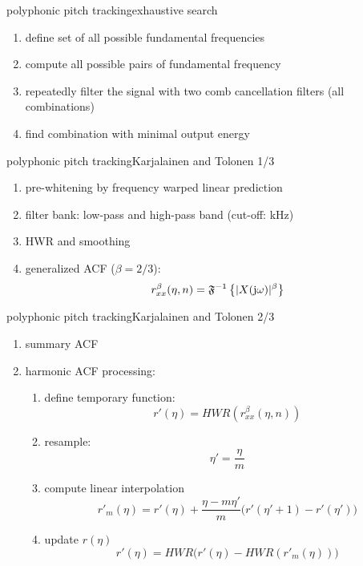 	\begin{frame}{polyphonic pitch tracking}{exhaustive search}
		\begin{enumerate}
			\item	define set of all possible fundamental frequencies
			\pause
			\item	compute all possible pairs of fundamental frequency
			\pause
			\item 	repeatedly filter the signal with two comb cancellation filters (all combinations)
			\pause
			\item	find combination with minimal output energy
		\end{enumerate}
	\end{frame}
	
	\begin{frame}{polyphonic pitch tracking}{Karjalainen and Tolonen 1/3}
		\begin{enumerate}
			\item	pre-whitening by frequency warped linear prediction
			\pause
			\item	filter bank: low-pass and high-pass band (cut-off: \unit[1]{kHz})
			\pause
			\item 	HWR and smoothing
			\pause
			\item	generalized ACF ($\beta = 2/3$):
						\begin{equation*}
							r_{xx}^\beta (\eta,n) = \mathfrak{F}^{-1}\left\{|X(\mathrm{j}\omega)|^\beta\right\} 
						\end{equation*}
		\end{enumerate}
	\end{frame}
	
	\begin{frame}{polyphonic pitch tracking}{Karjalainen and Tolonen 2/3}
		\begin{enumerate}
			\item	summary ACF
			\pause
			\item	harmonic ACF processing:
				\begin{enumerate}
					\item	define temporary function:
						\begin{equation*}
							r'(\eta) = HWR(r_{xx}^\beta (\eta,n)) 
						\end{equation*}
					\pause
					\item	resample:
						\begin{equation*}
							\eta' = \frac{\eta}{m}
						\end{equation*}
					\pause
					\item	compute linear interpolation
						\begin{equation*}
							r'_m(\eta) = r'(\eta) + \frac{\eta-m\eta'}{m}\big(r'(\eta'+1) - r'(\eta')\big)
						\end{equation*}
					\pause
					\item	update $r(\eta)$
						\begin{equation*}
							r'(\eta) = HWR\big(r'(\eta) - HWR(r'_m(\eta))\big) 
						\end{equation*}
				\end{enumerate}
		\end{enumerate}
	\end{frame}
	
